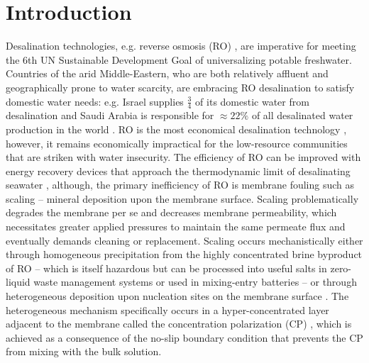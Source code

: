 \label{ROSSpy_chapter}

\section{Introduction}
Desalination technologies, e.g. reverse osmosis (RO) \cite{Malaeb2011ReverseReview}, are imperative for meeting the 6th UN Sustainable Development Goal \cite{Jones2018TheOutlook} of universalizing potable freshwater. Countries of the arid Middle-Eastern, who are both relatively affluent and geographically prone to water scarcity, are embracing RO desalination to satisfy domestic water needs: e.g. Israel supplies $\frac{3}{4}$ of its domestic water from desalination \cite{Shemer2017SustainableImpact} and Saudi Arabia is responsible for $\approx 22\%$ of all desalinated water production in the world \cite{Council2021WaterPrivatization}. RO is the most economical desalination technology \cite{Karime2008ROPlant,Hafez2003EconomicsStudy}, however, it remains economically impractical for the low-resource communities that are striken with water insecurity. The efficiency of RO can be improved \cite{Elimelech2011TheEnvironment,Semiat2008EnergyProcesses} with energy recovery devices \cite{Amy2017Membrane-basedProspects} that approach the thermodynamic limit of desalinating seawater \cite{Zarzo2018DesalinationFuture}, although, the primary inefficiency of RO is membrane fouling such as scaling \cite{Warsinger2015ScalingReview,Khan2013SourceSea,Tang2014FoulingPlant,Shmulevsky2017AnalysisMembranes} -- mineral deposition upon the membrane surface. Scaling problematically degrades the membrane per se and decreases membrane permeability, which necessitates greater applied pressures to maintain the same permeate flux and eventually demands cleaning or replacement. Scaling occurs mechanistically either through homogeneous precipitation from the highly concentrated brine byproduct of RO \cite{VanWagner2009EffectPerformance,Belfer1998SurfaceMembranes} -- which is itself hazardous \cite{Fernandez-torquemada2012DispersionPlants,Clemens1955ToxicityWells,Allen1989ApparatusBrine,Munn1989EffectCrops} but can be processed into useful salts \cite{Allen1954ProcessBrine,Fenton1992DesalinationWells} in zero-liquid waste management systems \cite{Jeppesen2009MetalConcentrate,Mavukkandy2019BrineGeneration} or used in mixing-entry batteries \cite{Ye2019Charge-FreeMaterials} -- or through heterogeneous deposition upon nucleation sites on the membrane surface \cite{Karabelas2014IncipientChannels,Warsinger2018InorganicOsmosis}. The heterogeneous mechanism specifically occurs in a hyper-concentrated layer adjacent to the membrane called the concentration polarization (CP)   \cite{McCutcheon2006InfluenceOsmosis,Murthy1997EstimationModel,Gruber2011ComputationalSystems,Sablani2001ConcentrationReview,Zydney1997StagnantSystems}, which is achieved as a consequence of the no-slip boundary condition that prevents the CP from mixing with the bulk solution. 

